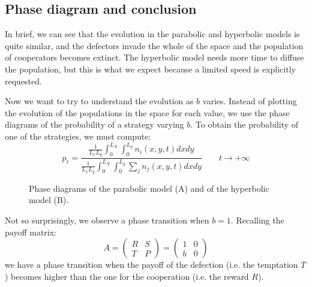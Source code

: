 \subsection{Phase diagram and conclusion}

In brief, we can see that the evolution in the parabolic and hyperbolic
models is quite similar, and the defectors invade the whole of the
space and the population of cooperators becomes extinct. The hyperbolic
model needs more time to diffuse the population, but this is what
we expect because a limited speed is explicitly requested.

Now we want to try to understand the evolution as $b$ varies. Instead
of plotting the evolution of the populations in the space for each
value, we use the phase diagrams of the probability of a strategy
varying $b$. To obtain the probability of one of the strategies,
we must compute:
\[
p_{\ell}=\frac{\frac{1}{L_{x}L_{y}}\int_{0}^{L_{X}}\int_{0}^{L_{y}}n_{i}(x,y,t)dxdy}{\frac{1}{L_{x}L_{y}}\int_{0}^{L_{X}}\int_{0}^{L_{y}}\sum_{j}n_{j}(x,y,t)dxdy}\qquad t\rightarrow+\infty
\]

\begin{figure}
\caption{Phase diagrams of the parabolic model (A) and of the hyperbolic model
(B).}

\end{figure}

Not so surprisingly, we observe a phase transition when $b=1$. Recalling
the payoff matrix:
\[
A=\left(\begin{array}{cc}
R & S\\
T & P
\end{array}\right)=\left(\begin{array}{cc}
1 & 0\\
b & 0
\end{array}\right)
\]
 we have a phase transition when the payoff of the defection (i.e.
the temptation $T$) becomes higher than the one for the cooperation
(i.e. the reward $R$). 
